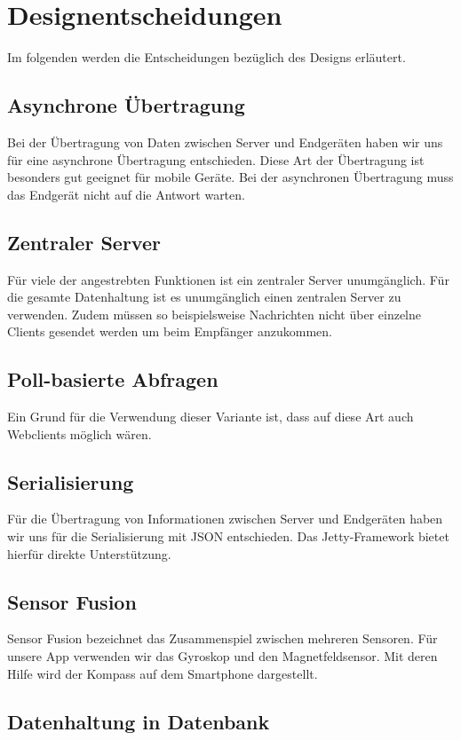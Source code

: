 \chapter{Designentscheidungen}
Im folgenden werden die Entscheidungen bezüglich des Designs erläutert.

\WIP

\section{Asynchrone Übertragung}
Bei der Übertragung von Daten zwischen Server und Endgeräten haben wir uns für eine asynchrone Übertragung entschieden. Diese Art der Übertragung ist besonders gut geeignet für mobile Geräte. Bei der asynchronen Übertragung muss das Endgerät nicht auf die Antwort warten.

\section{Zentraler Server}
Für viele der angestrebten Funktionen ist ein zentraler Server unumgänglich. Für die gesamte Datenhaltung ist es unumgänglich einen zentralen Server zu verwenden. Zudem müssen so beispielsweise Nachrichten nicht über einzelne Clients gesendet werden um beim Empfänger anzukommen. 

\section{Poll-basierte Abfragen}
Ein Grund für die Verwendung dieser Variante ist, dass auf diese Art auch Webclients möglich wären. 

\section{Serialisierung}
Für die Übertragung von Informationen zwischen Server und Endgeräten haben wir uns für die Serialisierung mit JSON entschieden. Das Jetty-Framework bietet hierfür direkte Unterstützung.


\section{Sensor Fusion}
Sensor Fusion bezeichnet das Zusammenspiel zwischen mehreren Sensoren. Für unsere App verwenden wir das Gyroskop und den Magnetfeldsensor. Mit deren Hilfe wird der Kompass auf dem Smartphone dargestellt. 

\section{Datenhaltung in Datenbank}
